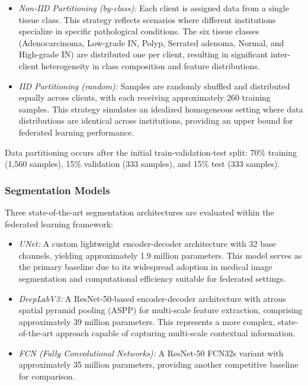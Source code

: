 \documentclass[conference]{IEEEtran}
\begin{document}
\begin{itemize}
\item \emph{Non-IID Partitioning (by-class):} Each client is assigned data from a single tissue class. This strategy reflects scenarios where different institutions specialize in specific pathological conditions. The six tissue classes (Adenocarcinoma, Low-grade IN, Polyp, Serrated adenoma, Normal, and High-grade IN) are distributed one per client, resulting in significant inter-client heterogeneity in class composition and feature distributions.

\item \emph{IID Partitioning (random):} Samples are randomly shuffled and distributed equally across clients, with each receiving approximately 260 training samples. This strategy simulates an idealized homogeneous setting where data distributions are identical across institutions, providing an upper bound for federated learning performance.
\end{itemize}

Data partitioning occurs after the initial train-validation-test split: 70\% training (1,560 samples), 15\% validation (333 samples), and 15\% test (333 samples).

\subsubsection{Segmentation Models}
Three state-of-the-art segmentation architectures are evaluated within the federated learning framework:

\begin{itemize}
\item \emph{UNet:} A custom lightweight encoder-decoder architecture with 32 base channels, yielding approximately 1.9 million parameters. This model serves as the primary baseline due to its widespread adoption in medical image segmentation and computational efficiency suitable for federated settings.

\item \emph{DeepLabV3:} A ResNet-50-based encoder-decoder architecture with atrous spatial pyramid pooling (ASPP) for multi-scale feature extraction, comprising approximately 39 million parameters. This represents a more complex, state-of-the-art approach capable of capturing multi-scale contextual information.

\item \emph{FCN (Fully Convolutional Networks):} A ResNet-50 FCN32s variant with approximately 35 million parameters, providing another competitive baseline for comparison.
\end{itemize}
\end{document}
